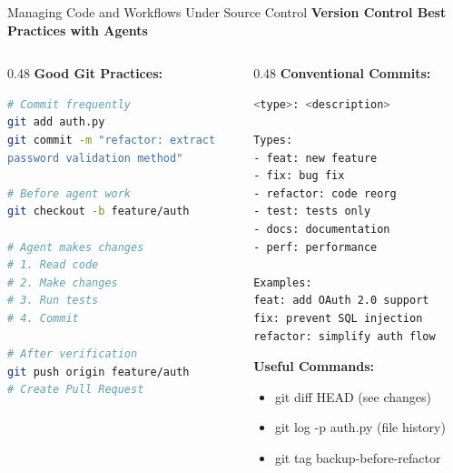\documentclass[aspectratio=169,11pt]{beamer}
\begin{document}
\begin{frame}[fragile]{Managing Code and Workflows Under Source Control}
    \textbf{Version Control Best Practices with Agents}

    \begin{columns}[T]
        \begin{column}{0.48\textwidth}
            \textbf{Good Git Practices:}
            \begin{lstlisting}[language=Bash]
# Commit frequently
git add auth.py
git commit -m "refactor: extract
password validation method"

# Before agent work
git checkout -b feature/auth

# Agent makes changes
# 1. Read code
# 2. Make changes
# 3. Run tests
# 4. Commit

# After verification
git push origin feature/auth
# Create Pull Request
            \end{lstlisting}
        \end{column}
        \begin{column}{0.48\textwidth}
            \textbf{Conventional Commits:}
            \begin{lstlisting}[language=Bash]
<type>: <description>

Types:
- feat: new feature
- fix: bug fix
- refactor: code reorg
- test: tests only
- docs: documentation
- perf: performance

Examples:
feat: add OAuth 2.0 support
fix: prevent SQL injection
refactor: simplify auth flow
            \end{lstlisting}

            \textbf{Useful Commands:}
            \begin{itemize}
                \item git diff HEAD (see changes)
                \item git log -p auth.py (file history)
                \item git tag backup-before-refactor
            \end{itemize}
        \end{column}
    \end{columns}
\end{frame}
\end{document}
